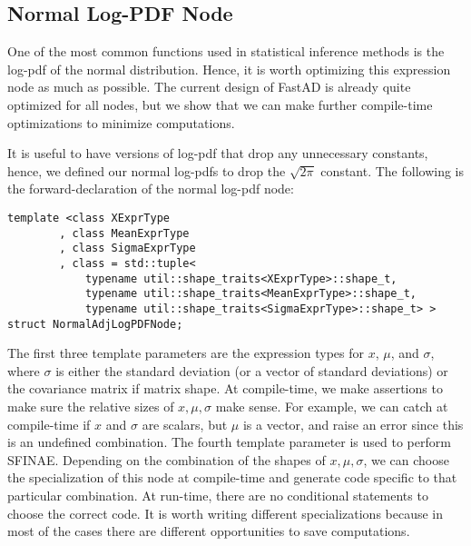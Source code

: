\subsection{Normal Log-PDF Node}\label{ssec:normal_log_pdf}

One of the most common functions used in statistical inference methods
is the log-pdf of the normal distribution.
Hence, it is worth optimizing this expression node as much as possible.
The current design of FastAD is already quite optimized for all nodes,
but we show that we can make further compile-time optimizations to minimize computations.

It is useful to have versions of log-pdf that drop any unnecessary constants,
hence, we defined our normal log-pdfs to drop the $\sqrt{2\pi}$ constant.
The following is the forward-declaration of the normal log-pdf node:
\begin{lstlisting}[style=customcpp]
template <class XExprType
        , class MeanExprType
        , class SigmaExprType
        , class = std::tuple<
            typename util::shape_traits<XExprType>::shape_t,
            typename util::shape_traits<MeanExprType>::shape_t,
            typename util::shape_traits<SigmaExprType>::shape_t> >
struct NormalAdjLogPDFNode;
\end{lstlisting}
The first three template parameters are the expression types for
$x$, $\mu$, and $\sigma$, where $\sigma$ is either the standard deviation
(or a vector of standard deviations) or the covariance matrix if matrix shape.
At compile-time, we make assertions to make sure the relative sizes of
$x, \mu, \sigma$ make sense.
For example, we can catch at compile-time 
if $x$ and $\sigma$ are scalars, but $\mu$ is a vector, and 
raise an error since this is an undefined combination.
The fourth template parameter is used to perform SFINAE.\@
Depending on the combination of the shapes of $x,\mu,\sigma$,
we can choose the specialization of this node at compile-time and 
generate code specific to that particular combination.
At run-time, there are no conditional statements to choose the correct code.
It is worth writing different specializations because in most of the cases
there are different opportunities to save computations.

